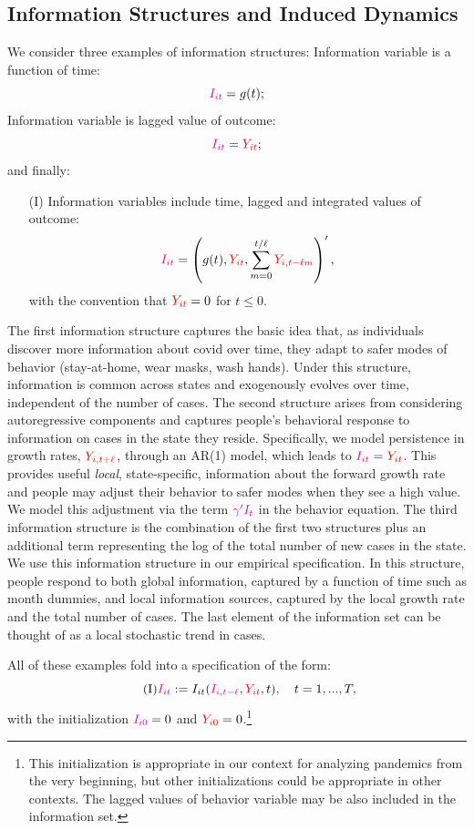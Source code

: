 \documentclass[11pt,reqno,letter]{amsart}
\theoremstyle{definition}
\def\icolor{\color{magenta}}
\def\ycolor{\color{red}}
\begin{document}
\subsection{Information Structures and Induced Dynamics}  We consider three examples of information
structures: Information variable is  a function of time:
$${\icolor I_{it}} = g(t);$$
 Information variable is lagged value of outcome:
$$
{\icolor I_{it}} =  {\ycolor Y_{it}};
 $$
 and finally:
 \begin{itemize}
 \item[(\textsc{I})] Information variables include time, lagged and integrated values of outcome:
 $$
{\icolor I_{it}} = \left (g(t) , {\ycolor Y_{it}},  \sum_{m=0}^{t/\ell}
{\ycolor Y_{i,t - \ell m}} \right) ',
 $$
 with the convention that ${\ycolor Y_{it}} = 0$  for $t \leq 0$.
\end{itemize}
The first information structure captures the  basic idea that, as individuals discover more information about covid over time, they adapt to safer modes of  behavior (stay-at-home, wear masks, wash hands). {Under this structure, information is common across states and exogenously evolves over time, independent of the number of cases.}
The second  structure  arises from considering
autoregressive components {and captures people's behavioral response to information on cases in the state they reside}.  {Specifically,} we model persistence in growth rates, ${\ycolor Y_{i,t+\ell}}$, through an AR(1) model, which leads to ${\icolor I_{it}}= {\ycolor Y_{it}}$. This provides useful \textit{local}, state-specific, information about the forward growth rate and people may adjust their behavior to safer modes when they see a high value. We model this adjustment via the term ${\icolor \gamma'I_{t}}$ in the behavior equation. The {third information} structure
is the combination of the first two structures plus an additional  term representing the log of the total number of new cases in the state. We use this information structure in our empirical specification. In this structure, people respond to both global information, captured by a function of time such as month dummies, and local information sources, captured by the local growth rate and the total number of cases.
The last element of the information set can be thought of as a local stochastic trend in cases.

All of these examples fold into a specification of the form:
\begin{equation}\label{eq:I}\tag{I}
 {\icolor I_{it} } :=   I_{it}({\icolor I_{i,t-\ell}}, {\ycolor Y_{it}}, t),  \quad t =1,..., T,
 \end{equation}
 with the initialization ${\icolor I_{i 0}} = 0$ and ${\ycolor Y_{i0}} = 0$.\footnote{This initialization is appropriate
 in our context for analyzing pandemics from the very beginning, but other initializations could be appropriate in other contexts. The  lagged values of behavior variable may be also included in the information set.
 }
\end{document}
